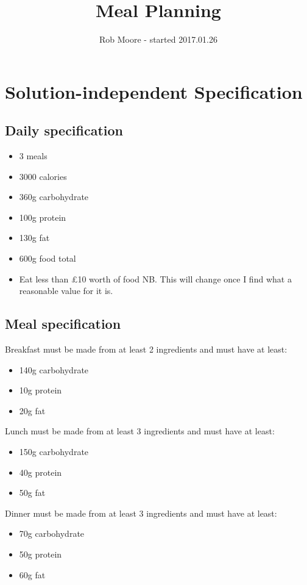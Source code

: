\documentclass[a4paper]{article}
\title{Meal Planning}
\author{Rob Moore - started 2017.01.26}
\begin{document}
\maketitle

\section{Solution-independent Specification}

\subsection{Daily specification}

\begin{itemize}
  \item 3 meals
  \item 3000 calories
  \item 360g carbohydrate
  \item 100g protein
  \item 130g fat
  \item 600g food total
  \item Eat less than £10 worth of food NB. This will change once I find what a reasonable value for it is.
\end{itemize}

\subsection{Meal specification}

Breakfast must be made from at least 2 ingredients and must have at least:
\begin{itemize}
  \item 140g carbohydrate
  \item 10g protein
  \item 20g fat
\end{itemize}

Lunch must be made from at least 3 ingredients and must have at least:
\begin{itemize}
  \item 150g carbohydrate
  \item 40g protein
  \item 50g fat
\end{itemize}

Dinner must be made from at least 3 ingredients and must have at least:
\begin{itemize}
  \item 70g carbohydrate
  \item 50g protein
  \item 60g fat
\end{itemize}
\end{document}
